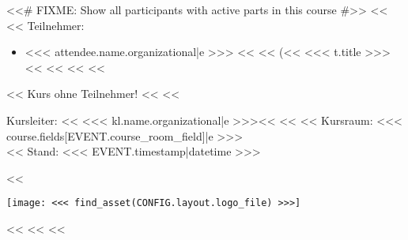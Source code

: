         <<# FIXME: Show all participants with active parts in this course #>>
        <<%
            <<%
                Teilnehmer:
                \begin{itemize}
                    <<%
                        \item <<< attendee.name.organizational|e >>>
                              <<%
                              <<%
                                (<<%
                                    <<< t.title >>><<%
                                 <<%
                              <<%
                    <<%
                \end{itemize}
            <<%
                Kurs ohne Teilnehmer!
            <<%
        <<%

        \vspace{\fill}
        \begin{minipage}[b]{\textwidth-2.5cm}%
            Kursleiter:
            <<%
                <<< kl.name.organizational|e >>><<%
            <<%
            <<%
                Kursraum: <<< course.fields[EVENT.course_room_field]|e >>>\\
            <<%
            Stand: <<< EVENT.timestamp|datetime >>>
        \end{minipage}%
        \hspace{0.5cm}%
        <<%
            \begin{minipage}[b][2cm][b]{2cm}%
                \texttt{[image: <<< find\_asset(CONFIG.layout.logo\_file) >>>]}
            \end{minipage}%
        <<%
        \pagebreak
    <<%
<<%
